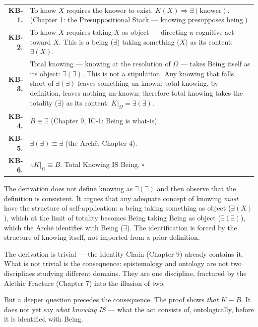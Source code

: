 \documentclass[10pt, openany, oneside]{book}
\renewcommand{\footnotesize}{\fontsize{8.5}{11}\selectfont}
\begin{document}
{\footnotesize
\noindent\begin{tabular}{r p{}}
\textbf{KB-1.} & To know $X$ requires the knower to exist. $K(X) \Rightarrow \exists(\text{knower})$. (Chapter 1: the Presuppositional Stack --- knowing presupposes being.) \\[0.3em]
\textbf{KB-2.} & To know $X$ requires taking $X$ as object --- directing a cognitive act toward $X$. This is a being ($\exists$) taking something ($X$) as its content: $\exists(X)$. \\[0.3em]
\textbf{KB-3.} & Total knowing --- knowing at the resolution of $\Omega$ --- takes Being itself as its object: $\exists(\exists)$. This is not a stipulation. Any knowing that falls short of $\exists(\exists)$ leaves something un-known; total knowing, by definition, leaves nothing un-known; therefore total knowing takes the totality ($\exists$) as its content: $K|_{\Omega} = \exists(\exists)$. \\[0.3em]
\textbf{KB-4.} & $B \equiv \exists$ (Chapter 9, IC-1: Being is what-is). \\[0.3em]
\textbf{KB-5.} & $\exists(\exists) \equiv \exists$ (the Arch\={e}, Chapter 4). \\[0.3em]
\textbf{KB-6.} & $\therefore K|_{\Omega} \equiv B$. Total Knowing IS Being. $\square$ \\[0.3em]
\end{tabular}
}

\vspace{0.8em}

\noindent The derivation does not define knowing as $\exists(\exists)$ and then observe that the definition is consistent. It argues that any adequate concept of knowing \textit{must} have the structure of self-application: a being taking something as object ($\exists(X)$), which at the limit of totality becomes Being taking Being as object ($\exists(\exists)$), which the Arch\={e} identifies with Being ($\exists$). The identification is forced by the structure of knowing itself, not imported from a prior definition.

\noindent The derivation is trivial --- the Identity Chain (Chapter 9) already contains it. What is not trivial is the consequence: epistemology and ontology are not two disciplines studying different domains. They are one discipline, fractured by the Alethic Fracture (Chapter 7) into the illusion of two.

But a deeper question precedes the consequence. The proof shows \textit{that} $K \equiv B$. It does not yet say \textit{what knowing IS} --- what the act consists of, ontologically, before it is identified with Being.
\end{document}
